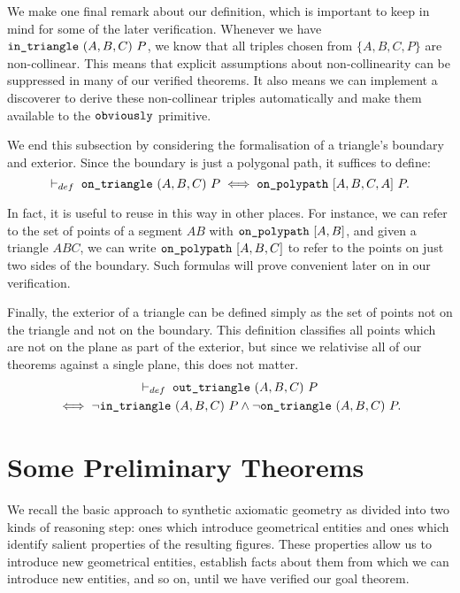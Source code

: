 
We make one final remark about our definition, which is important to keep in mind for some of the later verification. Whenever we have $\texttt{in\_triangle}\ (A,B,C)\ P$, we know that all triples chosen from $\{A,B,C,P\}$ are non-collinear. This means that explicit assumptions about non-collinearity can be suppressed in many of our verified theorems. It also means we can implement a discoverer  to derive these non-collinear triples automatically and make them available to the $\texttt{obviously}$ primitive. 

We end this subsection by considering the formalisation of a triangle's boundary and exterior. Since the boundary is just a polygonal path, it suffices to define:
\begin{equation}\label{eq:onTriangleDef}
\vdash_{def}\;\code{on\_triangle}\ (A,B,C)\ P \iff \code{on\_polypath}\ [A,B,C,A]\ P.
\end{equation}

In fact, it is useful to reuse  in this way in other places. For instance, we can refer to the set of points of a segment $AB$ with $\texttt{on\_polypath}\ [A,B]$, and given a triangle $ABC$, we can write $\code{on\_polypath}\ [A,B,C]$ to refer to the points on just two sides of the boundary. Such formulas will prove convenient later on in our verification.

Finally, the exterior of a triangle can be defined simply as the set of points not on the triangle and not on the boundary. This definition classifies all points which are not on the plane as part of the exterior, but since we relativise all of our theorems against a single plane, this does not matter.
\begin{multline*}
  \vdash_{def}\;\code{out\_triangle}\ (A,B,C)\ P\\
  \iff \neg\code{in\_triangle}\ (A,B,C)\ P\wedge\neg\code{on\_triangle}\ (A,B,C)\ P.
\end{multline*}

\section{Some Preliminary Theorems}
We recall the basic approach to synthetic axiomatic geometry as divided into two kinds of reasoning step: ones which introduce geometrical entities and ones which identify salient properties of the resulting figures. These properties allow us to introduce new geometrical entities, establish facts about them from which we can introduce new entities, and so on, until we have verified our goal theorem. 

